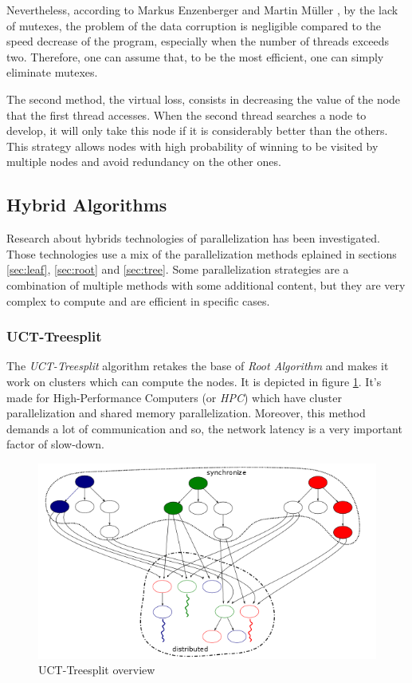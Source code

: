 Nevertheless, according to Markus Enzenberger and Martin Müller \cite{lock-free}, by the lack of mutexes, the problem of the data corruption is negligible compared to the speed decrease of the program, especially when the number of threads exceeds two. Therefore, one can assume that, to be the most efficient, one can simply eliminate mutexes.
\newline

The second method, the virtual loss, consists in decreasing the value of the node that the first thread accesses. When the second thread searches a node to develop, it will only take this node if it is considerably better than the others. This strategy allows nodes with high probability of winning to be visited by multiple nodes and avoid redundancy on the other ones.

\subsection{Hybrid Algorithms}

Research about hybrids technologies of parallelization has been investigated. Those technologies use a mix of the parallelization methods eplained in sections \ref{sec:leaf}, \ref{sec:root} and \ref{sec:tree}. Some parallelization strategies are a combination of multiple methods with some additional content, but they are very complex to compute and are efficient in specific cases.


\subsubsection{UCT-Treesplit}

The \emph{UCT-Treesplit} algorithm\cite{treesplit} retakes the base of \emph{Root Algorithm} and makes it work on clusters which can compute the nodes. %
It is depicted in figure \ref{treesplit}. It’s made for High-Performance Computers (or \emph{HPC}) which have cluster parallelization and shared memory parallelization. Moreover, this method demands a lot of communication and so, the network latency is a very important factor of slow-down.

\begin{figure}[!h] 
\centerline{\includegraphics[scale=0.60]{2_State_of_the_art/Strategy_of_root_parallelization_Mikail/treesplit.png}}
   \caption{\label{étiquette} UCT-Treesplit overview}
\label{treesplit}
\end{figure}

